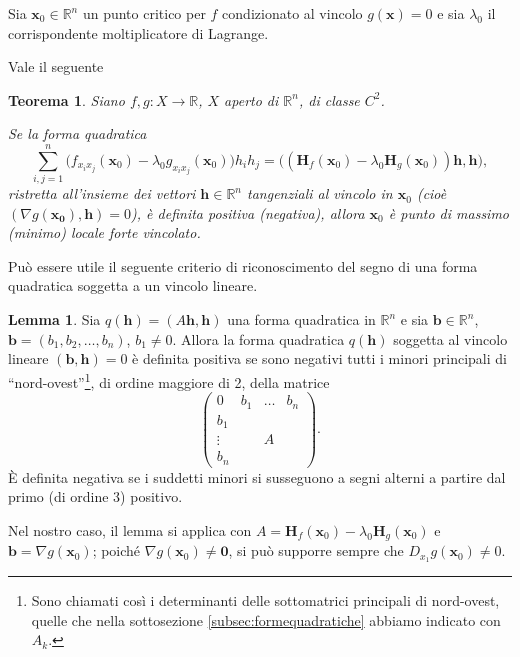 \documentclass[a4paper]{book}
\numberwithin{equation}{section}
\theoremstyle{plain}
\newtheorem{teor}{Teorema}[section]
\theoremstyle{definition}
\newtheorem{lem}{Lemma}[section]
\theoremstyle{remark}
\renewcommand{\vec}{\boldsymbol}
\theoremstyle{example}
\begin{document}
	Sia $\vec{x}_0 \in \mathbb{R}^n$ un punto critico per $f$ condizionato al vincolo $g(\vec{x}) = 0$ e sia $\lambda_0$ il corrispondente moltiplicatore di Lagrange.

	Vale il seguente
	\begin{teor}
		Siano $f, g \colon X \to \mathbb{R}$, $X$ aperto di $\mathbb{R}^n$, di classe $C^2$.

		Se la forma quadratica
		\begin{equation}
			\label{eqn:naturacritvinc}
			\sum_{i,j=1}^n\bigl(f_{x_ix_j}(\vec{x}_0) - \lambda_0 g_{x_ix_j}(\vec{x}_0) \bigr) h_ih_j = \bigl( (\mathbf{H}_f(\vec{x}_0) - \lambda_0\mathbf{H}_g(\vec{x}_0))\vec{h}, \vec{h}\bigr),
		\end{equation}
		ristretta all'insieme dei vettori $\vec{h} \in \mathbb{R}^n$ tangenziali al vincolo in $\vec{x}_0$ (cioè $(\nabla g(\vec{x_0}), \vec{h}) = 0$), è definita positiva (negativa), allora $\vec{x}_0$ è punto di massimo (minimo) locale forte vincolato.
	\end{teor}

	Può essere utile il seguente criterio di riconoscimento del segno di una forma quadratica soggetta a un vincolo lineare.

	\begin{lem}
		Sia $q(\vec{h}) = (A\vec{h}, \vec{h})$ una forma quadratica in $\mathbb{R}^n$ e sia $\vec{b} \in \mathbb{R}^n$, $\vec{b} = (b_1, b_2, \dots, b_n)$, $b_1 \ne 0$. Allora la forma quadratica $q(\vec{h})$ soggetta al vincolo lineare $(\vec{b}, \vec{h}) = 0$ è definita positiva se sono negativi tutti i minori principali di ``nord-ovest''\footnote{Sono chiamati così i determinanti delle sottomatrici principali di nord-ovest, quelle che nella sottosezione \ref{subsec:formequadratiche} abbiamo indicato con $A_k$.}, di ordine maggiore di 2, della matrice
		\begin{equation}
			\begin{pmatrix}
				0 & b_1 & \dots & b_n  \\
				b_1 \\
				\vdots &  &A \\
				b_n
				\end{pmatrix}.
			\end{equation}
			È definita negativa se i suddetti minori si susseguono a segni alterni a partire dal primo (di ordine 3) positivo.
		\end{lem}

		Nel nostro caso, il lemma si applica con $A = \mathbf{H}_f(\vec{x}_0) - \lambda_0 \mathbf{H}_g(\vec{x}_0)$ e $\vec{b} = \nabla g(\vec{x}_0)$; poiché $\nabla g(\vec{x}_0) \ne \vec{0}$, si può supporre sempre che $D_{x_1}g(\vec{x}_0) \ne 0$.
\end{document}
